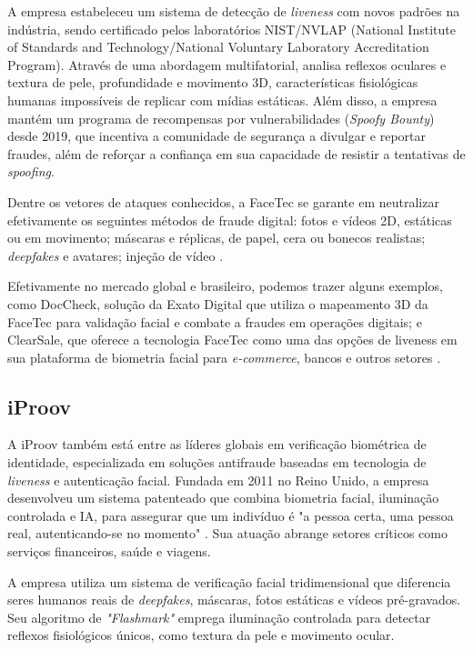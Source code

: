 A empresa estabeleceu um sistema de detecção de \textit{liveness} com novos padrões na indústria, sendo certificado pelos laboratórios NIST/NVLAP (National Institute of Standards and Technology/National Voluntary Laboratory Accreditation Program)\cite{nist_nvlap}. Através de uma abordagem multifatorial, analisa reflexos oculares e textura de pele, profundidade e movimento 3D, características fisiológicas humanas impossíveis de replicar com mídias estáticas. Além disso, a empresa mantém um programa de recompensas por vulnerabilidades (\textit{Spoofy Bounty}) desde 2019, que incentiva a comunidade de segurança a divulgar e reportar fraudes, além de reforçar a confiança em sua capacidade de resistir a tentativas de \textit{spoofing}.

Dentre os vetores de ataques conhecidos, a FaceTec se garante em neutralizar efetivamente os seguintes métodos de fraude digital: fotos e vídeos 2D, estáticas ou em movimento; máscaras e réplicas, de papel, cera ou bonecos realistas; \textit{deepfakes} e avatares; injeção de vídeo \cite{facetec_2025}. 

Efetivamente no mercado global e brasileiro, podemos trazer alguns exemplos, como DocCheck, solução da Exato Digital que utiliza o mapeamento 3D  da FaceTec para validação facial e combate a fraudes em operações digitais; e ClearSale, que oferece a tecnologia FaceTec como uma das opções de liveness em sua plataforma de biometria facial para \textit{e-commerce}, bancos e outros setores \cite{exato_digital_doccheck}.

\subsection{iProov}

A iProov também está entre as líderes globais em verificação biométrica de identidade, especializada em soluções antifraude baseadas em tecnologia de \textit{liveness} e autenticação facial. Fundada em 2011 no Reino Unido, a empresa desenvolveu um sistema patenteado que combina biometria facial, iluminação controlada e IA, para assegurar que um indivíduo é "a pessoa certa, uma pessoa real, autenticando-se no momento" \cite{iproov_2025}. Sua atuação abrange setores críticos como serviços financeiros, saúde e viagens.

A empresa utiliza um sistema de verificação facial tridimensional que diferencia seres humanos reais de \textit{deepfakes}, máscaras, fotos estáticas e vídeos pré-gravados. Seu algoritmo de \textit{"Flashmark"} emprega iluminação controlada para detectar reflexos fisiológicos únicos, como textura da pele e movimento ocular. \cite{iproov_2025}

